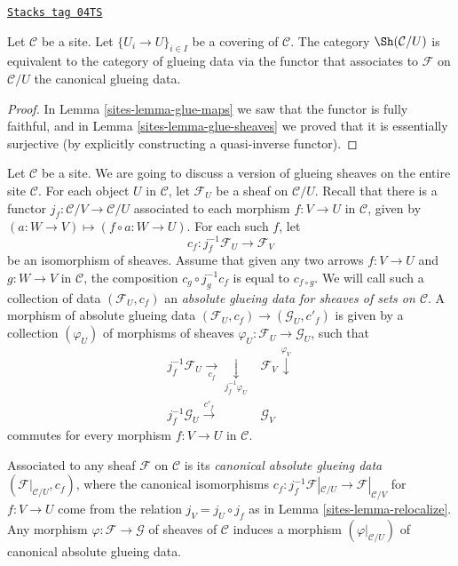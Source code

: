 \begin{lemma}
\label{sites-lemma-mapping-property-glue}
\href{https://stacks.math.columbia.edu/tag/04TS}{\texttt{Stacks tag 04TS}}

Let $\mathcal{C}$ be a site.
Let $\{U_i \to U\}_{i \in I}$ be a covering of $\mathcal{C}$.
The category $\Sh(\mathcal{C}/U)$ is equivalent
to the category of glueing data via the functor that associates
to $\mathcal{F}$ on $\mathcal{C}/U$ the canonical glueing data.
\end{lemma}

\begin{proof}

In
Lemma \ref{sites-lemma-glue-maps}
we saw that the functor is fully faithful, and in
Lemma \ref{sites-lemma-glue-sheaves}
we proved that it is essentially surjective (by explicitly constructing
a quasi-inverse functor).
\end{proof}

Let $\mathcal{C}$ be a site. We are going to discuss
a version of glueing sheaves on the entire site $\mathcal{C}$.
For each object $U$ in $\mathcal{C}$, let $\mathcal{F}_U$
be a sheaf on $\mathcal{C}/U$. Recall that there is a functor
$j_f : \mathcal{C}/V \rightarrow \mathcal{C}/U$ associated to each
morphism $f : V \rightarrow U$ in $\mathcal{C}$, given by
$(a : W \to V) \mapsto (f \circ a : W \to U)$. For each such $f$, let
$$
c_f : j_f^{-1} \mathcal{F}_U \to \mathcal{F}_V
$$
be an isomorphism of sheaves. Assume that given any two arrows
$f : V \to U$ and $g : W \to V$ in $\mathcal{C}$, the composition
$c_g \circ j_{g}^{-1} c_f$ is equal to $c_{f \circ g}$. We will call
such a collection of data $(\mathcal{F}_{U}, c_f)$ an
{\it absolute glueing data for sheaves of sets on $\mathcal{C}$}.
A morphism of absolute glueing data
$(\mathcal{F}_{U}, c_f) \to (\mathcal{G}_{U}, c'_f)$
is given by a collection $(\varphi_U)$
of morphisms of sheaves $\varphi_U : \mathcal{F}_U \to \mathcal{G}_U$,
such that
$$
\begin{array}{cc}j_f^{-1} \mathcal{F}_U \underset{c_f}{\longrightarrow}\underset{j_f^{-1} \varphi_U}{\downarrow} & \mathcal{F}_V \overset{\varphi_V}{\downarrow} \\ j_f^{-1} \mathcal{G}_U \overset{c'_f}{\longrightarrow} & \mathcal{G}_V\end{array}
$$
commutes for every morphism $f : V \to U$ in $\mathcal{C}$.

\medskip\noindent
Associated to any sheaf $\mathcal{F}$ on $\mathcal{C}$ is its
{\it canonical absolute glueing data} $(\mathcal{F}|_{\mathcal{C}/U},c_f)$,
where the canonical isomorphisms
$c_f : j_f^{-1} \mathcal{F}|_{\mathcal{C}/U} \to
\mathcal{F}|_{\mathcal{C}/V}$
for $f : V \to U$ come from the relation
$j_V = j_U \circ j_f$ as in Lemma \ref{sites-lemma-relocalize}.
Any morphism $\varphi : \mathcal{F} \to \mathcal{G}$
of sheaves of $\mathcal{C}$ induces a morphism
$(\varphi|_{\mathcal{C}/U})$ of canonical absolute glueing data.

